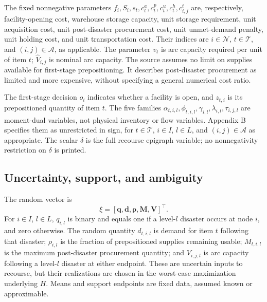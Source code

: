 \documentclass{article}
\begin{document}
The fixed nonnegative parameters $f_i,S_i,s_t,c_t^a,c_t^p,c_t^u,c_t^h,c^t_{i,j}$ are,
respectively, facility-opening cost, warehouse storage capacity, unit storage requirement,
unit acquisition cost, unit post-disaster procurement cost, unit unmet-demand penalty,
unit holding cost, and unit transportation cost. Their indices are $i\in\mathcal N$,
$t\in\mathcal T$, and $(i,j)\in\mathcal A$, as applicable. The parameter $v_t$ is arc
capacity required per unit of item $t$; $\hat V_{i,j}$ is nominal arc capacity.
The source assumes no limit on supplies available for first-stage prepositioning.
It describes post-disaster procurement as limited and more expensive, without specifying
a general numerical cost ratio.

The first-stage decision $o_i$ indicates whether a facility is open, and $z_{t,i}$ is its
prepositioned quantity of item $t$. The five families
$\alpha_{t,i,l},\phi_{t,i,l},\gamma_{i,l},\lambda_{i,l},\tau_{i,j,l}$ are moment-dual
variables, not physical inventory or flow variables. Appendix B specifies them as
unrestricted in sign, for $t\in\mathcal T$, $i\in I$, $l\in L$, and $(i,j)\in\mathcal A$
as appropriate. The scalar $\delta$ is the full recourse epigraph variable; no
nonnegativity restriction on $\delta$ is printed.

\subsection*{Uncertainty, support, and ambiguity}
The random vector is
\[
\xi=[\boldsymbol q,\boldsymbol d,\boldsymbol\rho,\boldsymbol M,\boldsymbol V]^\top.
\]
For $i\in I$, $l\in L$, $q_{i,l}$ is binary and equals one if a level-$l$ disaster occurs
at node $i$, and zero otherwise. The random quantity $d_{t,i,l}$ is demand for item $t$
following that disaster; $\rho_{i,l}$ is the fraction of prepositioned supplies remaining
usable; $M_{t,i,l}$ is the maximum post-disaster procurement quantity; and $V_{i,j,l}$ is
arc capacity following a level-$l$ disaster at either endpoint. These are uncertain
inputs to recourse, but their realizations are chosen in the worst-case maximization
underlying $H$. Means and support endpoints are fixed data, assumed known or approximable.
\end{document}
